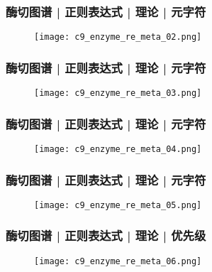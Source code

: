 \begin{frame}
  \frametitle{酶切图谱 | 正则表达式 | 理论 | 元字符}
  \begin{figure}
    \centering
    \texttt{[image: c9\_enzyme\_re\_meta\_02.png]}
  \end{figure}
\end{frame}

\begin{frame}
  \frametitle{酶切图谱 | 正则表达式 | 理论 | \alert{元字符}}
  \begin{figure}
    \centering
    \texttt{[image: c9\_enzyme\_re\_meta\_03.png]}
  \end{figure}
\end{frame}

\begin{frame}
  \frametitle{酶切图谱 | 正则表达式 | 理论 | \alert{元字符}}
  \begin{figure}
    \centering
    \texttt{[image: c9\_enzyme\_re\_meta\_04.png]}
  \end{figure}
\end{frame}

\begin{frame}
  \frametitle{酶切图谱 | 正则表达式 | 理论 | 元字符}
  \begin{figure}
    \centering
    \texttt{[image: c9\_enzyme\_re\_meta\_05.png]}
  \end{figure}
\end{frame}

\begin{frame}
  \frametitle{酶切图谱 | 正则表达式 | 理论 | 优先级}
  \begin{figure}
    \centering
    \texttt{[image: c9\_enzyme\_re\_meta\_06.png]}
  \end{figure}
\end{frame}

